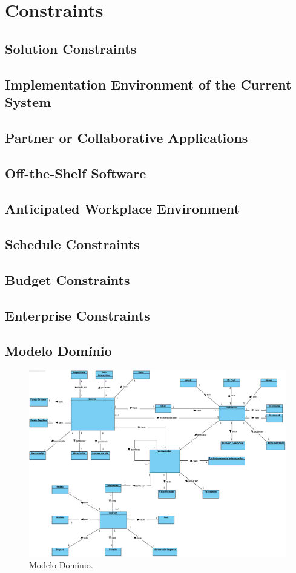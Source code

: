 \chapter{Constraints}

\section{Solution Constraints}

\section{Implementation Environment of the Current System}

\section{Partner or Collaborative Applications}

\section{Off-the-Shelf Software}

\section{Anticipated Workplace Environment}

\section{Schedule Constraints}

\section{Budget Constraints}

\section{Enterprise Constraints}

\section{Modelo Domínio}

\begin{figure}[]
	\includegraphics[scale=0.50]{modelo-dominio.png}
	\caption{Modelo Domínio.}
	\label{img:pag}
\end{figure}

